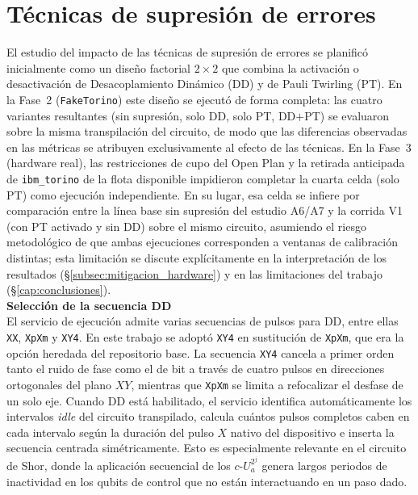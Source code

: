 \documentclass[12pt, spanish]{book}
\begin{document}
\section{Técnicas de supresión de errores}
\label{sec:supresion_implementada}

El estudio del impacto de las técnicas de supresión de errores se planificó inicialmente como un diseño factorial $2 \times 2$ que combina la activación o desactivación de Desacoplamiento Dinámico (DD) y de Pauli Twirling (PT). En la Fase~2 (\texttt{FakeTorino}) este diseño se ejecutó de forma completa: las cuatro variantes resultantes (sin supresión, solo DD, solo PT, DD$+$PT) se evaluaron sobre la misma transpilación del circuito, de modo que las diferencias observadas en las métricas se atribuyen exclusivamente al efecto de las técnicas. En la Fase~3 (hardware real), las restricciones de cupo del Open Plan y la retirada anticipada de \texttt{ibm\_torino} de la flota disponible impidieron completar la cuarta celda (solo PT) como ejecución independiente. En su lugar, esa celda se infiere por comparación entre la línea base sin supresión del estudio A6/A7 y la corrida V1 (con PT activado y sin DD) sobre el mismo circuito, asumiendo el riesgo metodológico de que ambas ejecuciones corresponden a ventanas de calibración distintas; esta limitación se discute explícitamente en la interpretación de los resultados (§\ref{subsec:mitigacion_hardware}) y en las limitaciones del trabajo (§\ref{cap:conclusiones}).\\

\textbf{Selección de la secuencia DD}\\

El servicio de ejecución admite varias secuencias de pulsos para DD, entre ellas \texttt{XX}, \texttt{XpXm} y \texttt{XY4}. En este trabajo se adoptó \texttt{XY4} en sustitución de \texttt{XpXm}, que era la opción heredada del repositorio base. La secuencia \texttt{XY4} cancela a primer orden tanto el ruido de fase como el de bit a través de cuatro pulsos en direcciones ortogonales del plano $XY$, mientras que \texttt{XpXm} se limita a refocalizar el desfase de un solo eje. Cuando DD está habilitado, el servicio identifica automáticamente los intervalos \textit{idle} del circuito transpilado, calcula cuántos pulsos completos caben en cada intervalo según la duración del pulso $X$ nativo del dispositivo e inserta la secuencia centrada simétricamente. Esto es especialmente relevante en el circuito de Shor, donde la aplicación secuencial de los $c\text{-}U_a^{2^j}$ genera largos periodos de inactividad en los qubits de control que no están interactuando en un paso dado.\\
\end{document}
